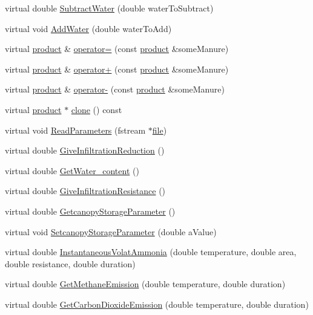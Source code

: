 \begin{DoxyCompactItemize}
\item 
virtual double \hyperlink{classmanure_a1bfcf202c765d99c51fb8ed6850e21a2}{SubtractWater} (double waterToSubtract)
\item 
virtual void \hyperlink{classmanure_aad5e7bf3c405be74990b85a5d4fd4b49}{AddWater} (double waterToAdd)
\item 
virtual \hyperlink{classproduct}{product} \& \hyperlink{classmanure_aefa4f7856537616586ae73e8a34cdf97}{operator=} (const \hyperlink{classproduct}{product} \&someManure)
\item 
virtual \hyperlink{classproduct}{product} \& \hyperlink{classmanure_a021351fd3857778590b48842dfd8fd5f}{operator+} (const \hyperlink{classproduct}{product} \&someManure)
\item 
virtual \hyperlink{classproduct}{product} \& \hyperlink{classmanure_a78dc3bbc39591aeb4ac6b3b722d66a0d}{operator-\/} (const \hyperlink{classproduct}{product} \&someManure)
\item 
virtual \hyperlink{classproduct}{product} $\ast$ \hyperlink{classmanure_af2915d37963e5f4d3a4b0c0d91fab188}{clone} () const 
\item 
virtual void \hyperlink{classmanure_a0bf5e3b02282ec2a7d265e04e2c3f561}{ReadParameters} (fstream $\ast$\hyperlink{classbase_a3af52ee9891719d09b8b19b42450b6f6}{file})
\item 
virtual double \hyperlink{classmanure_aa8504fd1f545f75b143d76c8991b2b87}{GiveInfiltrationReduction} ()
\item 
virtual double \hyperlink{classmanure_a25045c87941e46b757c706e7fd179a37}{GetWater\_\-content} ()
\item 
virtual double \hyperlink{classmanure_a0f2eab386e559113dba56d6d8cfb55e7}{GiveInfiltrationResistance} ()
\item 
virtual double \hyperlink{classmanure_aa5a3178bfb7d4f5f87fe41d1d8221ed5}{GetcanopyStorageParameter} ()
\item 
virtual void \hyperlink{classmanure_ae3f89476810dce15bb0e4d4a8d176bd5}{SetcanopyStorageParameter} (double aValue)
\item 
virtual double \hyperlink{classmanure_a88f9fce0227f2bac1dfa448c1d149b9d}{InstantaneousVolatAmmonia} (double temperature, double area, double resistance, double duration)
\item 
virtual double \hyperlink{classmanure_a6ecbd94610934e7ee281c62ea8d2fcde}{GetMethaneEmission} (double temperature, double duration)
\item 
virtual double \hyperlink{classmanure_ac9206359d7b5dcdcf7c1dba31f490342}{GetCarbonDioxideEmission} (double temperature, double duration)

\end{DoxyCompactItemize}
